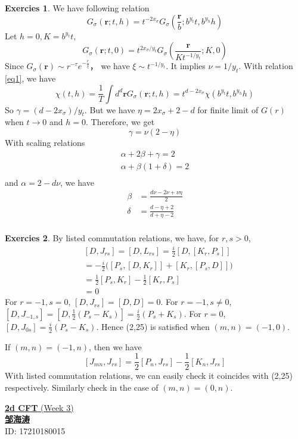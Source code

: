\documentclass[11pt,a4paper]{article}
\theoremstyle{definition}
\newtheorem{exer}{Exercies}[subsection]
\begin{document}
\begin{exer}
	We have following relation
	\begin{equation}\label{eq1}
	G_{\sigma}(\mathbf{r};t,h) = t^{-2x_{\sigma}}G_\sigma (\frac{\mathbf{r}}{b};b^{y_t}t,b^{y_h}h)
	\end{equation}
	Let $h=0, K= b^{y_t}t$,	
	\[
	G_{\sigma}(\mathbf{r};t,0) = t^{2x_{\sigma}/y_{t}}G_\sigma (\frac{\mathbf{r}}{K t^{-1/y_{t}}};K,0)
	\]
	Since $ G_{\sigma}(\mathbf{r}) \sim r^{-\tau} e^{-\frac{r}{\xi}}$， we have $\xi \sim t^{-1/y_t}$. It implies $\nu = 1/y_t$. With relation \ref{eq1}, we have 
	\[
	\chi(t,h)= \frac{1}{T} \int d^d \mathbf{r} G_\sigma (\mathbf{r};t,h)= t^{d-2x_\sigma} \chi (b^{y_t}t, b^{y_h}h)
	\]
	So $\gamma = (d-2x_\sigma)/y_t$. But we have $\eta = 2 x_\sigma +2 -d$ for finite limit of $G(r)$ when $t \to 0$ and $h=0$. Therefore, we get
	\[
	\gamma = \nu(2-\eta)
	\]With scaling relations
	\[
	\begin{aligned}
	\alpha + 2 \beta + \gamma =2\\
	\alpha + \beta (1+\delta) =2\\
	\end{aligned}
	\]
	and $\alpha = 2 -d \nu$, we have
	\[
	\begin{aligned}
	\beta &= \frac{d\nu -2\nu + \nu \eta}{2}\\
	\delta &= \frac{d-\eta +2}{d+\eta -2}\\
	\end{aligned}
	\]
	\end{exer}
\begin{exer}
	By listed commutation relations, we have, for $r, s > 0$,
	\[
	\begin{aligned}
	&[D, J_{rs}]= [D, L_{rs}] = \frac{i}{2} [D, [K_r, P_s]]\\
	 & =-\frac{i}{2}\big([P_s,[D,K_r]]+ [K_r,[P_s,D]]\big)\\
	 & =\frac{1}{2}[P_s, K_r] -\frac{1}{2}[K_r, P_s]\\
	 &=0
	\end{aligned}
	\]
	For $r=-1,s=0$, $[D,J_{rs}]= [D,D]=0$. For $r=-1, s\neq 0$, $[D,J_{-1,s}]=[D,\frac{1}{2}(P_s - K_s)]= \frac{i}{2}(P_s +K_s)$. For $r=0$, $[D, J_{0s}] = \frac{i}{2}(P_s - K_s)$. Hence (2,25) is satisfied when $(m,n)=(-1,0)$.
	
	If $(m,n)=(-1,n)$, then we have 
	\[
	[J_{mn},J_{rs}] = \frac{1}{2}[P_n, J_{rs}] -\frac{1	}{2} [K_n, J_{rs}]
	\]
	With listed commutation relations, we can easily check it coincides with (2,25) respectively. Similarly check in the case of $(m,n)= (0,n)$. 
\end{exer}
\newpage
\noindent
{\LARGE\underline{\textbf{2d CFT} (Week 3)}}\\
{\hfill\large  \underline{\textbf{邹海涛}} \\
	\hfill ID: 17210180015}\\
\end{document}
